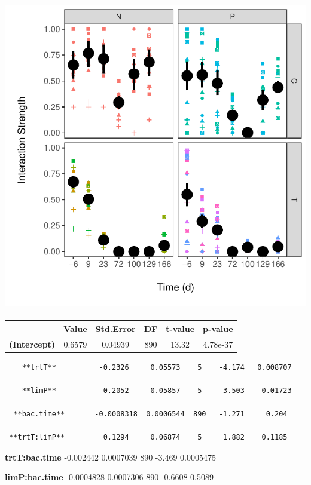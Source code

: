 \documentclass[]{article}
\begin{document}
\subsection{\texorpdfstring{\protect\includegraphics{analysis_ecoevostoich_files/figure-latex/unnamed-chunk-19-1.pdf}}{}}\label{section-1}

\begin{longtable}[]{@{}cccccc@{}}
\toprule
~ & Value & Std.Error & DF & t-value & p-value\tabularnewline
\midrule
\endhead
\textbf{(Intercept)} & 0.6579 & 0.04939 & 890 & 13.32 &
4.78e-37\tabularnewline
\bottomrule
\end{longtable}

\begin{verbatim}
    **trtT**          -0.2326     0.05573    5    -4.174   0.008707 

    **limP**          -0.2052     0.05857    5    -3.503    0.01723 

  **bac.time**       -0.0008318  0.0006544  890   -1.271     0.204  

 **trtT:limP**         0.1294     0.06874    5     1.882    0.1185  
\end{verbatim}

\textbf{trtT:bac.time} -0.002442 0.0007039 890 -3.469 0.0005475

\textbf{limP:bac.time} -0.0004828 0.0007306 890 -0.6608 0.5089
\end{document}
